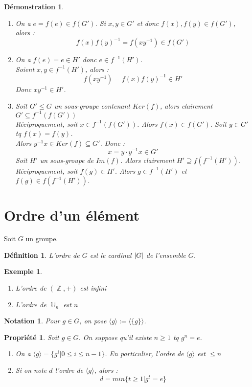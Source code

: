\documentclass[a4paper, oneside]{report}
\theoremstyle{break}
\newtheorem{defi}[thm]{Définition}
\newtheorem{propr}[thm]{Propriété}
\newtheorem{nota}[thm]{Notation}
\newtheorem{exem}[thm]{Exemple}
\newtheorem*{demo}{Démonstration}
\DeclareMathOperator{\Z}{\mathbb{Z}}
\DeclareMathOperator{\U}{\mathbb{U}}
\DeclarePairedDelimiter\abs{\lvert}{\rvert}%
\begin{document}
\begin{demo}
	\begin{enumerate}
		\item On a $e=f(e)\in f(G')$. Si $x,y\in G'$ et donc $f(x),f(y)\in f(G')$, alors :
		$$f(x)f(y)^{-1}=f(xy^{-1})\in f(G')$$
		
		\item On a $f(e)=e \in H'$ donc $e\in f^{-1}(H')$.\\
		Soient $x,y\in f^{-1}(H')$, alors :
		$$f(xy^{-1})=f(x)f(y)^{-1} \in H'$$
		Donc $xy^{-1}\in H'$.
		
		\item Soit $G'\leq G$ un sous-groupe contenant $Ker(f)$, alors clairement $G'\subseteq f^{-1}(f(G'))$\\
		Réciproquement, soit $x\in f^{-1}(f(G'))$. Alors $f(x)\in f(G')$. Soit $y\in G'$ tq $f(x)=f(y)$.\\
		Alors $y^{-1}x\in Ker(f)\subseteq G'$. Donc :
		$$x = y \cdot y^{-1}x \in G'$$
		Soit $H'$ un sous-groupe de $Im(f)$. Alors clairement $H'\supseteq f(f^{-1}(H'))$.\\
		Réciproquement, soit $f(g)\in H'$. Alors $g\in f^{-1}(H')$ et $f(g)\in f(f^{-1}(H'))$.
	\end{enumerate}
\end{demo}

\section{Ordre d'un élément}
Soit $G$ un groupe.\\

\begin{defi}
	L'ordre de $G$ est le cardinal $\abs{G}$ de l'ensemble $G$.
\end{defi}

\begin{exem}
	\begin{enumerate}
		\item L'ordre de $(\Z,+)$ est infini
		\item L'ordre de $\U_n$ est $n$
	\end{enumerate}
\end{exem}

\begin{nota}
	Pour $g\in G$, on pose $\langle g\rangle := \langle\{ g \}\rangle$.
\end{nota}

\begin{propr}
	Soit $g\in G$. On suppose qu'il existe $n\geq 1$ tq $g^n=e$.
	\begin{enumerate}
		\item On a $\langle g\rangle = \{g^i | 0\leq i \leq n-1 \}$. En particulier, l'ordre de $\langle g\rangle$ est $\leq n$
		\item Si on note $d$ l'ordre de $\langle g\rangle$, alors :
		$$d=min\{t\geq 1 | g^t=e \}$$
	\end{enumerate}
\end{propr}
\end{document}
